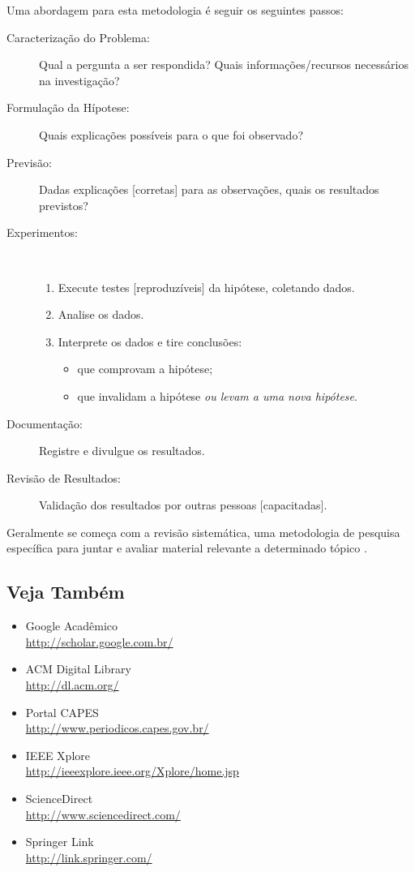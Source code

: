 Uma abordagem para esta metodologia é seguir os seguintes passos:
\begin{description}
	\item[Caracterização do Problema:] Qual a pergunta a ser respondida? Quais 
informações/recursos necessários na investigação?
	\item[Formulação da Hípotese:] Quais explicações possíveis para o que foi observado?
	\item[Previsão:] Dadas explicações [corretas] para as observações, quais os 
	resultados previstos?
	\item[Experimentos:] \ \\\vspace{-2em} 
		\begin{enumerate}
			\item Execute testes [reproduzíveis] da hipótese, coletando dados.
			\item Analise os dados.
			\item Interprete os dados e tire conclusões:
				\begin{itemize}
				\item que comprovam a hipótese;
				\item que invalidam a hipótese \emph{ou levam a uma nova hipótese}.
				\end{itemize}
		\end{enumerate}
	\item[Documentação:] Registre e divulgue os resultados.
	\item[Revisão de Resultados:] Validação dos resultados por outras pessoas 
	[capacitadas].
\end{description}%

Geralmente se começa com a revisão sistemática, uma metodologia de pesquisa 
específica para juntar e avaliar material relevante a determinado tópico 
\cite{Biolchini_2005_Systematicreviewin}.

\subsection{Veja Também}
\begin{itemize}
	\item Google Acadêmico
		\\\url{http://scholar.google.com.br/}%
	\item ACM Digital Library
		\\\url{http://dl.acm.org/}%
	\item Portal CAPES
		\\\url{http://www.periodicos.capes.gov.br/}%
	\item IEEE Xplore
		\\\url{http://ieeexplore.ieee.org/Xplore/home.jsp}%
	\item ScienceDirect
		\\\url{http://www.sciencedirect.com/}%
	\item Springer Link
		\\\url{http://link.springer.com/}%
\end{itemize}

